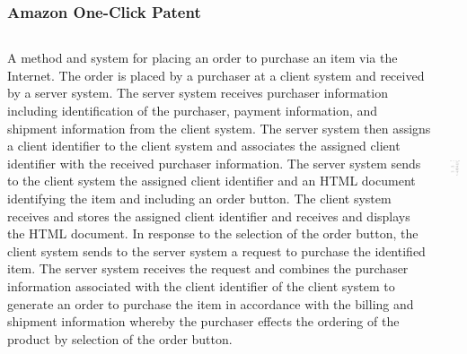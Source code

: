 \documentclass{beamer}
\begin{document}
\begin{frame}
	\frametitle{Amazon One-Click Patent}
  \begin{columns}[T]
    \begin{column}{.5\textwidth}
	\begin{block}{}
	\tiny A method and system for placing an order to purchase an item via the Internet. The order is placed by a purchaser at a client system and received by a server system. The server system receives purchaser information including identification of the purchaser, payment information, and shipment information from the client system. The server system then assigns a client identifier to the client system and associates the assigned client identifier with the received purchaser information. The server system sends to the client system the assigned client identifier and an HTML document identifying the item and including an order button. The client system receives and stores the assigned client identifier and receives and displays the HTML document. In response to the selection of the order button, the client system sends to the server system a request to purchase the identified item. The server system receives the request and combines the purchaser information associated with the client identifier of the client system to generate an order to purchase the item in accordance with the billing and shipment information whereby the purchaser effects the ordering of the product by selection of the order button.
    \end{block}
	\end{column}
	\begin{column}{.5\textwidth}
	\begin{block}{}
	  \includegraphics[height=2.75in,angle=0]{Amazon.png}
    \end{block}
	\end{column}
	\end{columns}
\end{frame}
\end{document}

